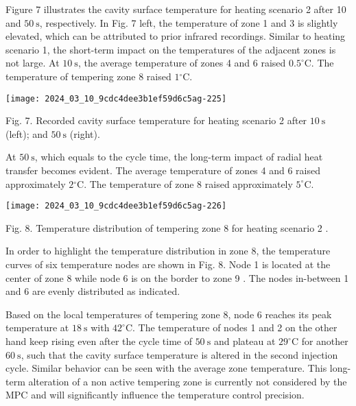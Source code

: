 \documentclass[10pt]{article}
\begin{document}
Figure 7 illustrates the cavity surface temperature for heating scenario 2 after 10 and $50 \mathrm{~s}$, respectively. In Fig. 7 left, the temperature of zone 1 and 3 is slightly elevated, which can be attributed to prior infrared recordings. Similar to heating scenario 1, the short-term impact on the temperatures of the adjacent zones is not large. At $10 \mathrm{~s}$, the average temperature of zones 4 and 6 raised $0.5^{\circ} \mathrm{C}$. The temperature of tempering zone 8 raised $1{ }^{\circ} \mathrm{C}$.

\begin{center}
\texttt{[image: 2024\_03\_10\_9cdc4dee3b1ef59d6c5ag-225]}
\end{center}

Fig. 7. Recorded cavity surface temperature for heating scenario 2 after $10 \mathrm{~s}$ (left); and $50 \mathrm{~s}$ (right).

At $50 \mathrm{~s}$, which equals to the cycle time, the long-term impact of radial heat transfer becomes evident. The average temperature of zones 4 and 6 raised approximately $2{ }^{\circ} \mathrm{C}$. The temperature of zone 8 raised approximately $5^{\circ} \mathrm{C}$.

\begin{center}
\texttt{[image: 2024\_03\_10\_9cdc4dee3b1ef59d6c5ag-226]}
\end{center}

Fig. 8. Temperature distribution of tempering zone 8 for heating scenario 2 .

In order to highlight the temperature distribution in zone 8, the temperature curves of six temperature nodes are shown in Fig. 8. Node 1 is located at the center of zone 8 while node 6 is on the border to zone 9 . The nodes in-between 1 and 6 are evenly distributed as indicated.

Based on the local temperatures of tempering zone 8, node 6 reaches its peak temperature at $18 \mathrm{~s}$ with $42^{\circ} \mathrm{C}$. The temperature of nodes 1 and 2 on the other hand keep rising even after the cycle time of $50 \mathrm{~s}$ and plateau at $29^{\circ} \mathrm{C}$ for another $60 \mathrm{~s}$, such that the cavity surface temperature is altered in the second injection cycle. Similar behavior can be seen with the average zone temperature. This long-term alteration of a non active tempering zone is currently not considered by the MPC and will significantly influence the temperature control precision.
\end{document}
